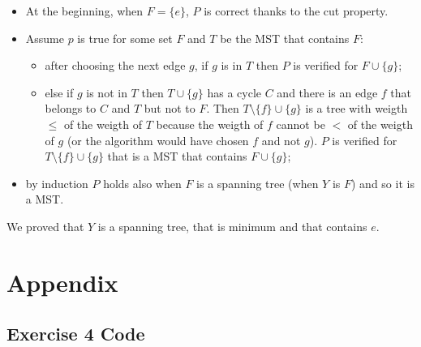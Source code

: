 \documentclass[paper=a4, fontsize=11pt]{scrartcl} %
\numberwithin{equation}{section} %
\numberwithin{figure}{section} %
\numberwithin{table}{section} %
\begin{document}
\begin{itemize}
    \item At the beginning, when $F = \{e\}$, $P$ is correct thanks to the cut property.
    \item Assume $p$ is true for some set $F$ and $T$ be the MST that contains $F$:
    \begin{itemize}
        \item after choosing the next edge $g$, if $g$ is in $T$ then $P$ is verified for $F \cup \{g\}$;
        \item else if $g$ is not in $T$ then $T \cup \{g\}$ has a cycle $C$ and there is an edge $f$ that belongs to $C$ and $T$ but not to $F$. Then $T \setminus \{f\} \cup \{g\}$ is a tree with weigth $\leq$ of the weigth of $T$ because the weigth of $f$ cannot be $<$ of the weigth of $g$ (or the algorithm would have chosen $f$ and not $g$). $P$ is verified for $T \setminus \{f\} \cup \{g\}$ that is a MST that contains $F \cup \{g\}$; 
    \end{itemize}
    \item by induction $P$ holds also when $F$ is a spanning tree (when $Y$ is $F$) and so it is a MST.
\end{itemize}

We proved that $Y$ is a spanning tree, that is minimum and that contains $e$.

\newpage

\section*{Appendix}

\subsection*{Exercise 4 Code}
\end{document}
